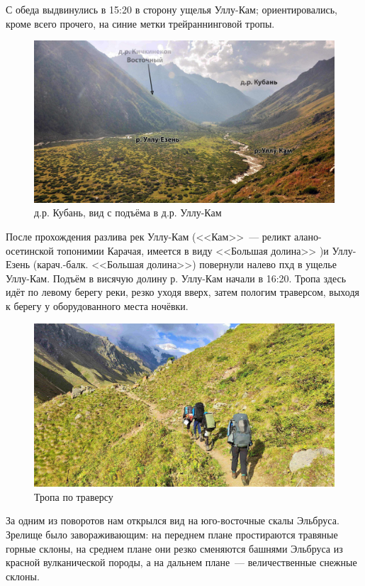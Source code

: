 С обеда выдвинулись в 15:20 в сторону ущелья Уллу-Кам; ориентировались, кроме всего прочего, на синие метки трейраннинговой тропы.

\begin{figure}[h!]
	\centering
	\includegraphics[width=0.7\linewidth]{../pics/DSC_0464 2.JPG}
	\caption{д.р. Кубань, вид с подъёма в д.р. Уллу-Кам}
	\label{fig:DSC_0464 2.JPG}
\end{figure}

После прохождения разлива рек Уллу-Кам (<<Кам>>~--- реликт алано-осетинской топонимии Карачая, имеется в виду <<Большая долина>> \cite{proza})и Уллу-Езень (карач.-балк. <<Большая долина>>) повернули налево пхд в ущелье Уллу-Кам. Подъём в висячую долину р. Уллу-Кам начали в 16:20. Тропа здесь идёт по левому берегу реки, резко уходя вверх, затем пологим траверсом, выходя к берегу у оборудованного места ночёвки.


\begin{figure}[h!]
	\centering
	\includegraphics[width=0.7\linewidth]{../pics/IMG_20240829_170756.jpg}
	\caption{Тропа по траверсу}
	\label{fig:IMG_20240829_170756.jpg}
\end{figure}

За одним из поворотов нам открылся вид на юго-восточные скалы Эльбруса. Зрелище было завораживающим: на переднем плане простираются травяные горные склоны, на среднем плане они резко сменяются башнями Эльбруса из красной вулканической породы, а на дальнем плане~--- величественные снежные склоны.

